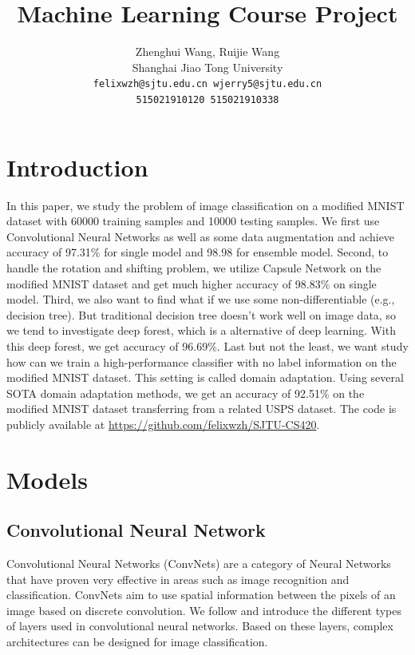 \documentclass{article} %
\title{Machine Learning Course Project}
\author{Zhenghui Wang, Ruijie Wang\\
	Shanghai Jiao Tong University\\
{\tt felixwzh@sjtu.edu.cn wjerry5@sjtu.edu.cn}\\
{\tt 515021910120 515021910338}
}
\begin{document}
\maketitle


\section{Introduction}
In this paper, we study the problem of image classification on a modified MNIST dataset with 60000 training samples and 10000 testing samples. We first use Convolutional Neural Networks as well as some data augmentation and achieve accuracy of 97.31\% for single model and 98.98 for ensemble model. Second, to handle the rotation and shifting problem, we utilize Capsule Network on the modified MNIST dataset and get much higher accuracy of 98.83\% on single model. Third, we also want to find what if we use some non-differentiable (e.g., decision tree). But traditional decision tree doesn't work well on image data, so we tend to investigate deep forest, which is a alternative of deep learning. With this deep forest, we get accuracy of 96.69\%. Last but not the least, we want study how can we train a high-performance classifier with no label information on the modified MNIST dataset. This setting is called domain adaptation. Using several SOTA domain adaptation methods, we get an accuracy of 92.51\% on the modified MNIST dataset transferring from a related USPS dataset. The code is publicly available at \url{https://github.com/felixwzh/SJTU-CS420}.
\section{Models}

\subsection{Convolutional Neural Network}
Convolutional Neural Networks (ConvNets) are a category of Neural Networks that have proven very effective in areas such as image recognition and classification. ConvNets aim to use spatial information between the pixels of an image based on discrete convolution. We follow \citep{cnn} and introduce the different types of layers used in convolutional neural networks. Based on these layers, complex architectures can be designed for image classification. 
\end{document}
